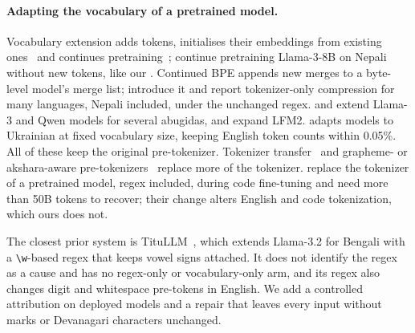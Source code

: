 \paragraph{Adapting the vocabulary of a pretrained model.} Vocabulary extension adds tokens, initialises their embeddings from existing ones~\citep{gee-etal-2022-fast,minixhofer-etal-2022-wechsel,dobler-de-melo-2023-focus,liu-etal-2024-ofa} and continues pretraining~\citep{tejaswi-etal-2024-exploring,kim2024eeve,csaki2024sambalingo,nag2024efficientcpt}; \citet{duwal2024nepalidapt} continue pretraining Llama-3-8B on Nepali without new tokens, like our \RO{}. Continued BPE appends new merges to a byte-level model's merge list; \citet{purason-etal-2026-teaching} introduce it and report tokenizer-only compression for many languages, Nepali included, under the unchanged regex. \citet{yamaguchi2026lowres} and \citet{yamaguchi2025elchat} extend Llama-3 and Qwen models for several abugidas, and \citet{smith2026inplace} expand LFM2. \citet{didenko2026writing} adapts models to Ukrainian at fixed vocabulary size, keeping English token counts within 0.05\%. All of these keep the original pre-tokenizer. Tokenizer transfer~\citep{minixhofer2024zett,minixhofer2025alm} and grapheme- or akshara-aware pre-tokenizers~\citep{kapila2026typedriven,darshana2026wwho} replace more of the tokenizer. \citet{dagan2024getting} replace the tokenizer of a pretrained model, regex included, during code fine-tuning and need more than 50B tokens to recover; their change alters English and code tokenization, which ours does not.

The closest prior system is TituLLM~\citep{nahin-etal-2025-titullms}, which extends Llama-3.2 for Bengali with a \texttt{\textbackslash w}-based regex that keeps vowel signs attached. It does not identify the regex as a cause and has no regex-only or vocabulary-only arm, and its regex also changes digit and whitespace pre-tokens in English. We add a controlled attribution on deployed models and a repair that leaves every input without marks or Devanagari characters unchanged.
